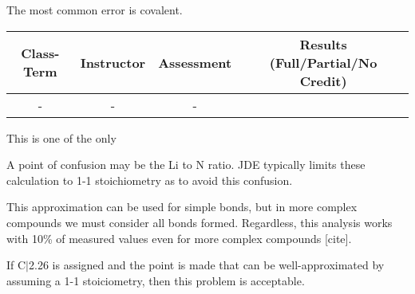 \begin{outcomes}

The most common error is covalent.

\begin{center}
	\begin{tabular}{cccc}
		\hline\hline
                Class-Term & Instructor & Assessment & Results (Full/Partial/No Credit) \\
		\hline
                - & - & - &  \\
		\hline
	\end{tabular}
\end{center}

\end{outcomes}
%
\begin{comments}

This is one of the only 

A point of confusion may be the Li to N ratio. JDE typically limits these calculation to 1-1 stoichiometry as to avoid this confusion.

This approximation can be used for simple bonds, but in more complex compounds we must consider all bonds formed. Regardless, this analysis works with 10\% of measured values even for more complex compounds [cite].

If C$|$2.26 is assigned and the point is made that  can be well-approximated by assuming a 1-1 stoiciometry, then this problem is acceptable.
\end{comments}